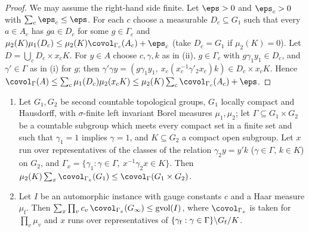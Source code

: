 \begin{proof}
We may assume the right-hand side finite. Let $\eps>0$ and $\eps_c>0$ with $\sum_c\eps_c\le\eps$. For each $c$ choose a
measurable $D_c\subseteq G_1$ such that every $a\in A_c$ has $ga\in D_c$ for some $g\in\Gamma_c$ and
$\mu_2(K)\mu_1(D_c)\le\mu_2(K)\covol_{\Gamma_c}(A_c)+\eps_c$ (take $D_c=G_1$ if $\mu_2(K)=0$). Let
$D=\bigcup_cD_c\times x_cK$. For $y\in A$ choose $c,\gamma,k$ as in (ii), $g\in\Gamma_c$ with $g\gamma_1y_1\in D_c$, and
$\gamma'\in\Gamma$ as in (i) for $g$; then $\gamma'\gamma y=(g\gamma_1y_1,\ x_c(x_c^{-1}\gamma'_2x_c)k)\in D_c\times x_cK$. Hence
$\covol_\Gamma(A)\le\sum_c\mu_1(D_c)\mu_2(x_cK)\le\mu_2(K)\sum_c\covol_{\Gamma_c}(A_c)+\eps$.
\end{proof}

\begin{lemma}\label{pf:rows:dcsum}
\begin{enumerate}[label=(\alph*)]
\item Let $G_1,G_2$ be second countable topological groups, $G_1$ locally compact and Hausdorff, with $\sigma$-finite left
invariant Borel measures $\mu_1,\mu_2$; let $\Gamma\subseteq G_1\times G_2$ be a countable subgroup which meets every compact set in a
finite set and such that $\gamma_1=1$ implies $\gamma=1$, and $K\subseteq G_2$ a compact open subgroup. Let $x$ run over representatives
of the classes of the relation $\gamma_2y=y'k$ ($\gamma\in\Gamma$, $k\in K$) on $G_2$, and $\Gamma_x=\{\gamma_1:\gamma\in\Gamma,\
x^{-1}\gamma_2x\in K\}$. Then $\mu_2(K)\sum_x\covol_{\Gamma_x}(G_1)\le\covol_\Gamma(G_1\times G_2)$.
\item Let $I$ be an automorphic instance with gauge constants $c$ and a Haar measure $\mu_{\mathrm f}$. Then
$\sum_x\prod_vc_v\,\covol_{\Gamma_x}(\rowsGinf)\le\rowsgv(I)$, where $\covol_{\Gamma_x}$ is taken for $\prod_v\mu_v$ and $x$ runs over
representatives of $\{\gamma_{\mathrm f}:\gamma\in\Gamma\}\backslash G_{\mathrm f}/K$.
\end{enumerate}
\end{lemma}

